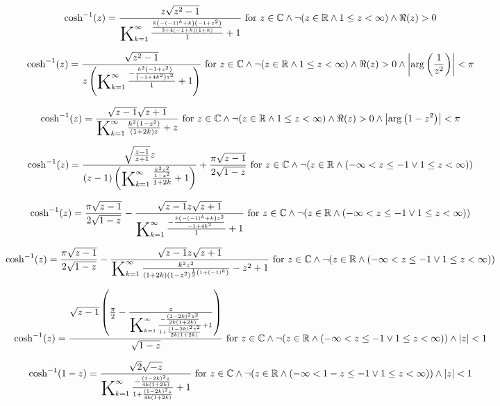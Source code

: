 \documentclass{article}
\newcommand{\bigK}{\mathop{\raisebox{-5pt}{\huge K}}}
\begin{document}
\[\cosh ^{-1}(z)=\frac{z \sqrt{z^2-1}}{\bigK_{k=1}^{\infty}\frac{\frac{k \left(-(-1)^k+k\right) \left(-1+z^2\right)}{3+4 (-1+k) (1+k)}}{1}+1}\text{ for }z\in \mathbb{C}\land \neg (z\in \mathbb{R}\land 1\leq z<\infty )\land \Re(z)>0\] 

\[\cosh ^{-1}(z)=\frac{\sqrt{z^2-1}}{z \left(\bigK_{k=1}^{\infty}\frac{-\frac{k^2 \left(-1+z^2\right)}{\left(-1+4 k^2\right) z^2}}{1}+1\right)}\text{ for }z\in \mathbb{C}\land \neg (z\in \mathbb{R}\land 1\leq z<\infty )\land \Re(z)>0\land \left| \arg \left(\frac{1}{z^2}\right)\right| <\pi\] 

\[\cosh ^{-1}(z)=\frac{\sqrt{z-1} \sqrt{z+1}}{\bigK_{k=1}^{\infty}\frac{k^2 \left(1-z^2\right)}{(1+2 k) z}+z}\text{ for }z\in \mathbb{C}\land \neg (z\in \mathbb{R}\land 1\leq z<\infty )\land \Re(z)>0\land \left| \arg \left(1-z^2\right)\right| <\pi\] 

\[\cosh ^{-1}(z)=\frac{\sqrt{\frac{z-1}{z+1}} z}{(z-1) \left(\bigK_{k=1}^{\infty}\frac{\frac{k^2 z^2}{1-z^2}}{1+2 k}+1\right)}+\frac{\pi  \sqrt{z-1}}{2 \sqrt{1-z}}\text{ for }z\in \mathbb{C}\land \neg (z\in \mathbb{R}\land (-\infty <z\leq -1\lor 1\leq z<\infty ))\] 

\[\cosh ^{-1}(z)=\frac{\pi  \sqrt{z-1}}{2 \sqrt{1-z}}-\frac{\sqrt{z-1} z \sqrt{z+1}}{\bigK_{k=1}^{\infty}\frac{-\frac{k \left(-(-1)^k+k\right) z^2}{-1+4 k^2}}{1}+1}\text{ for }z\in \mathbb{C}\land \neg (z\in \mathbb{R}\land (-\infty <z\leq -1\lor 1\leq z<\infty ))\] 

\[\cosh ^{-1}(z)=\frac{\pi  \sqrt{z-1}}{2 \sqrt{1-z}}-\frac{\sqrt{z-1} z \sqrt{z+1}}{\bigK_{k=1}^{\infty}\frac{k^2 z^2}{(1+2 k) \left(1-z^2\right)^{\frac{1}{2} \left(1+(-1)^k\right)}}-z^2+1}\text{ for }z\in \mathbb{C}\land \neg (z\in \mathbb{R}\land (-\infty <z\leq -1\lor 1\leq z<\infty ))\] 

\[\cosh ^{-1}(z)=\frac{\sqrt{z-1} \left(\frac{\pi }{2}-\frac{z}{\bigK_{k=1}^{\infty}\frac{-\frac{(1-2 k)^2 z^2}{2 k (1+2 k)}}{1+\frac{(1-2 k)^2 z^2}{2 k (1+2 k)}}+1}\right)}{\sqrt{1-z}}\text{ for }z\in \mathbb{C}\land \neg (z\in \mathbb{R}\land (-\infty <z\leq -1\lor 1\leq z<\infty ))\land \left| z\right| <1\] 

\[\cosh ^{-1}(1-z)=\frac{\sqrt{2} \sqrt{-z}}{\bigK_{k=1}^{\infty}\frac{-\frac{(1-2 k)^2 z}{4 k (1+2 k)}}{1+\frac{(1-2 k)^2 z}{4 k (1+2 k)}}+1}\text{ for }z\in \mathbb{C}\land \neg (z\in \mathbb{R}\land (-\infty <1-z\leq -1\lor 1\leq z<\infty ))\land \left| z\right| <1\] 
\end{document}
